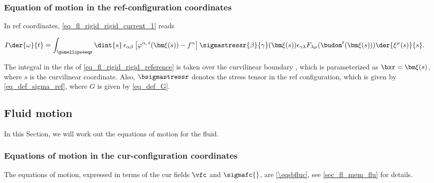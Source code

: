 \subsubsection{Equation of motion in the \acl{ref}-configuration coordinates}\label{sec_rigid_body_body_reference}

In  \ac{ref} coordinates, \cref{eq_fl_rigid_rigid_current_1} reads

\bw
\begin{align}
        \label{eq_fl_rigid_rigid_reference}
        I \der{\omega}{t} & = \int_\pomellipseeqr \dint{s} \, \epsilon_{\alpha \beta} \left[ \varphi^{\alpha, \, t}(\bxi{s}) - \focalpoint^\alpha \right] \sigmastressr{\beta}{\gamma}(\bxi{s}) \epsilon_{\gamma \lambda} F_{\lambda \mu}(\budom^t(\bxi{s})) \der{\xi^\mu(s)}{s}.
\end{align}
\ew

The integral in the \ac{rhs} of  \cref{eq_fl_rigid_rigid_reference} is taken over the curvilinear boundary \pomellipser, which is parameterized as $\bxr = \bxi{s}$, where $s$ is the curvilinear coordinate. Also, $\bsigmastressr$ denotes the stress tensor in the \ac{ref} configuration, which is given by \cref{eq_def_sigma_ref}, where $G$ is given by \cref{eq_def_G}.


\subsection{Fluid motion}\label{sec_rigid_body_fl}

In this Section, we will work out the equations of motion for the fluid.

\subsubsection{Equations of motion in the \acl{cur}-configuration coordinates}\label{sec_rigid_body_fl_cur}



The equations of motion, expressed in terms of the \ac{cur} fields $\vfc$ and $\sigmafc{}$, are \cref{\eqsbfluc}, see \cref{sec_fl_mem_flu} for details.



